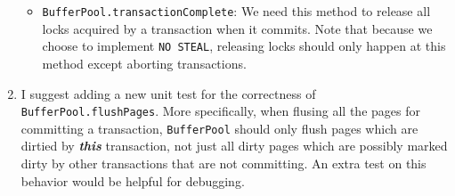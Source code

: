 \documentclass[10pt]{myland}
\begin{document}
\begin{enumerate}[label=\textbf{\arabic*.}, listparindent=0.0em, itemsep=2em]
\begin{itemize}
        \item \texttt{BufferPool.transactionComplete}: We need this method to release all locks acquired by a
            transaction when it commits. Note that because we choose to implement \texttt{NO STEAL}, releasing locks
            should only happen at this method except aborting transactions.
	\end{itemize}

    \item I suggest adding a new unit test for the correctness of \texttt{BufferPool.flushPages}. More specifically,
        when flusing all the pages for committing a transaction, \texttt{BufferPool} should only flush pages which are
        dirtied by \textbf{\emph{this}} transaction, not just all dirty pages which are possibly marked dirty by other
        transactions that are not committing. An extra test on this behavior would be helpful for debugging.


\end{enumerate}
\end{document}
